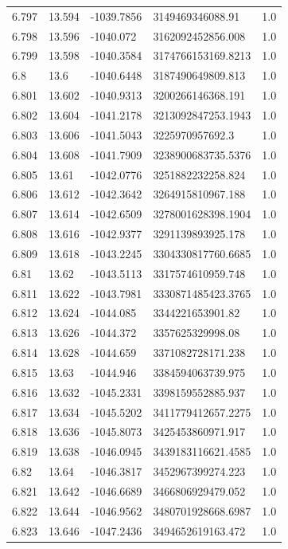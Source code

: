 \begin{tabular}{lllll}
6.797 & 13.594 & -1039.7856 & 3149469346088.91 & 1.0 \\
6.798 & 13.596 & -1040.072 & 3162092452856.008 & 1.0 \\
6.799 & 13.598 & -1040.3584 & 3174766153169.8213 & 1.0 \\
6.8 & 13.6 & -1040.6448 & 3187490649809.813 & 1.0 \\
6.801 & 13.602 & -1040.9313 & 3200266146368.191 & 1.0 \\
6.802 & 13.604 & -1041.2178 & 3213092847253.1943 & 1.0 \\
6.803 & 13.606 & -1041.5043 & 3225970957692.3 & 1.0 \\
6.804 & 13.608 & -1041.7909 & 3238900683735.5376 & 1.0 \\
6.805 & 13.61 & -1042.0776 & 3251882232258.824 & 1.0 \\
6.806 & 13.612 & -1042.3642 & 3264915810967.188 & 1.0 \\
6.807 & 13.614 & -1042.6509 & 3278001628398.1904 & 1.0 \\
6.808 & 13.616 & -1042.9377 & 3291139893925.178 & 1.0 \\
6.809 & 13.618 & -1043.2245 & 3304330817760.6685 & 1.0 \\
6.81 & 13.62 & -1043.5113 & 3317574610959.748 & 1.0 \\
6.811 & 13.622 & -1043.7981 & 3330871485423.3765 & 1.0 \\
6.812 & 13.624 & -1044.085 & 3344221653901.82 & 1.0 \\
6.813 & 13.626 & -1044.372 & 3357625329998.08 & 1.0 \\
6.814 & 13.628 & -1044.659 & 3371082728171.238 & 1.0 \\
6.815 & 13.63 & -1044.946 & 3384594063739.975 & 1.0 \\
6.816 & 13.632 & -1045.2331 & 3398159552885.937 & 1.0 \\
6.817 & 13.634 & -1045.5202 & 3411779412657.2275 & 1.0 \\
6.818 & 13.636 & -1045.8073 & 3425453860971.917 & 1.0 \\
6.819 & 13.638 & -1046.0945 & 3439183116621.4585 & 1.0 \\
6.82 & 13.64 & -1046.3817 & 3452967399274.223 & 1.0 \\
6.821 & 13.642 & -1046.6689 & 3466806929479.052 & 1.0 \\
6.822 & 13.644 & -1046.9562 & 3480701928668.6987 & 1.0 \\
6.823 & 13.646 & -1047.2436 & 3494652619163.472 & 1.0 \\

\end{tabular}

